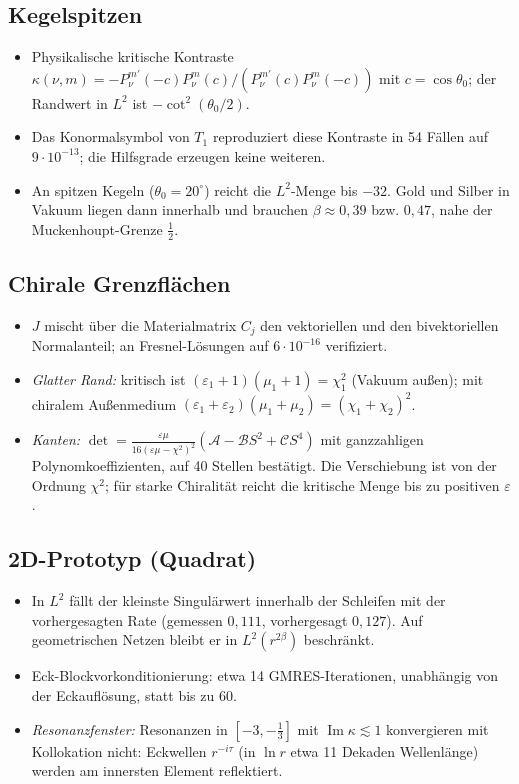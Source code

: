 \documentclass[11pt, a4paper]{article}
\newcommand{\st}[1]{{\small\sffamily[#1]}}
\begin{document}
\subsection{Kegelspitzen}
\begin{itemize}[leftmargin=*]
  \item Physikalische kritische Kontraste
    $\kappa(\nu,m)=-P_\nu^{m\prime}(-c)P_\nu^m(c)/(P_\nu^{m\prime}(c)P_\nu^m(-c))$ mit
    $c=\cos\theta_0$; der Randwert in $L^2$ ist $-\cot^2(\theta_0/2)$. \st{exakt}
  \item Das Konormalsymbol von $T_1$ reproduziert diese Kontraste in 54 Fällen auf
    $9\cdot10^{-13}$; die Hilfsgrade erzeugen keine weiteren. \st{numerisch}
  \item An spitzen Kegeln ($\theta_0=20^\circ$) reicht die $L^2$-Menge bis $-32$. Gold und
    Silber in Vakuum liegen dann innerhalb und brauchen $\beta\approx0{,}39$ bzw. $0{,}47$,
    nahe der Muckenhoupt-Grenze $\tfrac12$.
\end{itemize}

\subsection{Chirale Grenzflächen}
\begin{itemize}[leftmargin=*]
  \item $J$ mischt über die Materialmatrix $C_j$ den vektoriellen und den bivektoriellen
    Normalanteil; an Fresnel-Lösungen auf $6\cdot10^{-16}$ verifiziert. \st{numerisch}
  \item \emph{Glatter Rand:} kritisch ist $(\varepsilon_1+1)(\mu_1+1)=\chi_1^2$ (Vakuum außen);
    mit chiralem Außenmedium $(\varepsilon_1+\varepsilon_2)(\mu_1+\mu_2)=(\chi_1+\chi_2)^2$. \st{exakt / numerisch}
  \item \emph{Kanten:}
    $\det=\frac{\varepsilon\mu}{16(\varepsilon\mu-\chi^2)^2}(\mathcal A-\mathcal BS^2+\mathcal CS^4)$
    mit ganzzahligen Polynomkoeffizienten, auf 40 Stellen bestätigt. Die Verschiebung ist
    von der Ordnung $\chi^2$; für starke Chiralität reicht die kritische Menge bis zu
    positiven $\varepsilon$. \st{numerisch}
\end{itemize}

\subsection{2D-Prototyp (Quadrat)}
\begin{itemize}[leftmargin=*]
  \item In $L^2$ fällt der kleinste Singulärwert innerhalb der Schleifen mit der
    vorhergesagten Rate (gemessen $0{,}111$, vorhergesagt $0{,}127$). Auf geometrischen Netzen
    bleibt er in $L^2(r^{2\beta})$ beschränkt. \st{numerisch}
  \item Eck-Blockvorkonditionierung: etwa 14 GMRES-Iterationen, unabhängig von der
    Eckauflösung, statt bis zu 60.
  \item \emph{Resonanzfenster:} Resonanzen in $[-3,-\tfrac13]$ mit
    $\operatorname{Im}\kappa\lesssim1$ konvergieren mit Kollokation nicht: Eckwellen $r^{-i\tau}$ (in $\ln r$
    etwa 11 Dekaden Wellenlänge) werden am innersten Element reflektiert.
\end{itemize}
\end{document}
